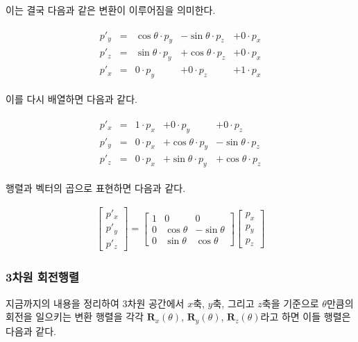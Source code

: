 이는 결국 다음과 같은 변환이 이루어짐을 의미한다.

\begin{eqnarray}
\begin{array}{clrrr}
p'_y  & = &\cos \theta \cdot p_y &- \sin \theta \cdot p_z &+ 0 \cdot p_x \\
p'_z  & = &\sin \theta \cdot p_y &+ \cos \theta \cdot p_z &+ 0 \cdot p_x \\
p'_x  & = & 0 \cdot p_y &+ 0 \cdot p_z &+ 1 \cdot p_x
\end{array}
\end{eqnarray}

이를 다시 배열하면 다음과 같다.

\begin{eqnarray}
\begin{array}{clrrr}
p'_x  & = & 1 \cdot p_x & + 0 \cdot p_y &+ 0 \cdot p_z  \\
p'_y  & = & 0 \cdot p_x & + \cos \theta \cdot p_y &- \sin \theta \cdot p_z \\
p'_z  & = & 0 \cdot p_x & + \sin \theta \cdot p_y &+ \cos \theta \cdot p_z  
\end{array}
\end{eqnarray}

행렬과 벡터의 곱으로 표현하면 다음과 같다.

\begin{eqnarray}
\left [ \begin{array}{c} p'_x \\ p'_y \\ p'_z  \end{array} \right ] 
=
\left [ \begin{array}{rrr}
1 & 0 & 0 \\
0 & \cos \theta & - \sin \theta \\
0 & \sin \theta & \cos \theta
\end{array} \right ]
\left [ \begin{array}{c} p_x \\ p_y \\ p_z \end{array} \right ] 
\end{eqnarray}


\subsubsection{3차원 회전행렬}

지금까지의 내용을 정리하여 3차원 공간에서 $x$축, $y$축, 그리고 $z$축을 기준으로 $\theta$만큼의 회전을 일으키는 변환 행렬을
각각 $\mathbf R_x(\theta)$, $\mathbf R_y(\theta)$, $\mathbf R_z(\theta)$라고 하면 이들 행렬은 다음과 같다.

